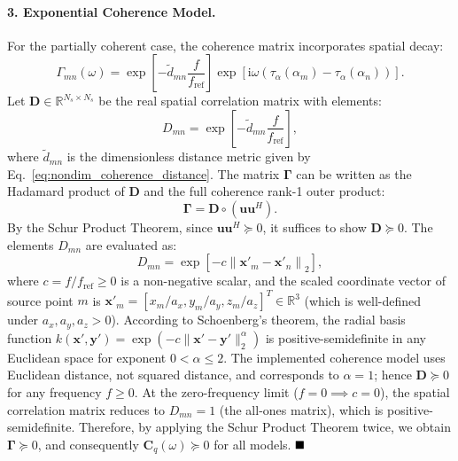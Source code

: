 \documentclass[11pt]{article}
\newcommand{\ii}{\mathrm{i}}
\newcommand{\vect}[1]{\bm{#1}}
\newcommand{\mat}[1]{\bm{#1}}
\begin{document}
\paragraph{3. Exponential Coherence Model.}
For the partially coherent case, the coherence matrix incorporates spatial decay:
\begin{equation*}
    \Gamma_{mn}(\omega) = \exp\left[ - \tilde{d}_{mn} \frac{f}{f_{\mathrm{ref}}} \right] \exp\left[ \ii \omega \left( \tau_\alpha(\alpha_m) - \tau_\alpha(\alpha_n) \right) \right].
\end{equation*}
Let $\mat{D} \in \mathbb{R}^{N_s \times N_s}$ be the real spatial correlation matrix with elements:
\begin{equation*}
    D_{mn} = \exp\left[ - \tilde{d}_{mn} \frac{f}{f_{\mathrm{ref}}} \right],
\end{equation*}
where $\tilde{d}_{mn}$ is the dimensionless distance metric given by Eq.~\ref{eq:nondim_coherence_distance}. The matrix $\mat{\Gamma}$ can be written as the Hadamard product of $\mat{D}$ and the full coherence rank-1 outer product:
\begin{equation*}
    \mat{\Gamma} = \mat{D} \circ (\vect{u}\vect{u}^H).
\end{equation*}
By the Schur Product Theorem, since $\vect{u}\vect{u}^H \succeq 0$, it suffices to show $\mat{D} \succeq 0$.
The elements $D_{mn}$ are evaluated as:
\begin{equation*}
    D_{mn} = \exp\left[ - c \left\| \vect{x}'_m - \vect{x}'_n \right\|_2 \right],
\end{equation*}
where $c = f/f_{\mathrm{ref}} \ge 0$ is a non-negative scalar, and the scaled coordinate vector of source point $m$ is $\vect{x}'_m = [x_m/a_x, y_m/a_y, z_m/a_z]^T \in \mathbb{R}^3$ (which is well-defined under $a_x, a_y, a_z > 0$). According to Schoenberg's theorem, the radial basis function $k(\vect{x}', \vect{y}') = \exp\left( - c \|\vect{x}' - \vect{y}'\|_2^\alpha \right)$ is positive-semidefinite in any Euclidean space for exponent $0 < \alpha \le 2$. The implemented coherence model uses Euclidean distance, not squared distance, and corresponds to $\alpha=1$; hence $\mat{D}\succeq0$ for any frequency $f \ge 0$. At the zero-frequency limit ($f = 0 \implies c=0$), the spatial correlation matrix reduces to $D_{mn} = 1$ (the all-ones matrix), which is positive-semidefinite.
Therefore, by applying the Schur Product Theorem twice, we obtain $\mat{\Gamma} \succeq 0$, and consequently $\mat{C}_q(\omega) \succeq 0$ for all models. $\hfill \blacksquare$
\end{document}
